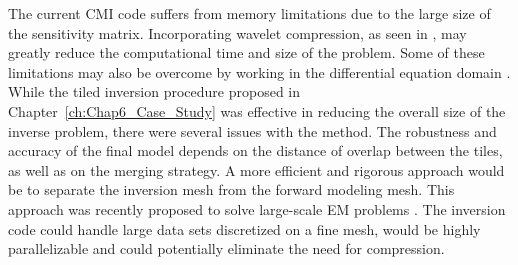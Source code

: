 The current CMI code suffers from memory limitations due to the large size of the sensitivity matrix. 
Incorporating wavelet compression, as seen in \cite{LiOldenburg03}, may greatly reduce the computational time and size of the problem.
Some of these limitations may also be overcome by working in the differential equation domain \cite[]{Davis2013}. 
While the tiled inversion procedure proposed in Chapter~\ref{ch:Chap6_Case_Study} was effective in reducing the overall size of the inverse problem, there were several issues with the method. The robustness and accuracy of the final model depends on the distance of overlap between the tiles, as well as on the merging strategy. A more efficient and rigorous approach would be to separate the inversion mesh from the forward modeling mesh. This approach was recently proposed to solve large-scale EM problems \cite[]{Yang2014, Haber2014}. The inversion code could handle large data sets discretized on a fine mesh, would be highly parallelizable and could potentially eliminate the need for compression.
 
\endinput

